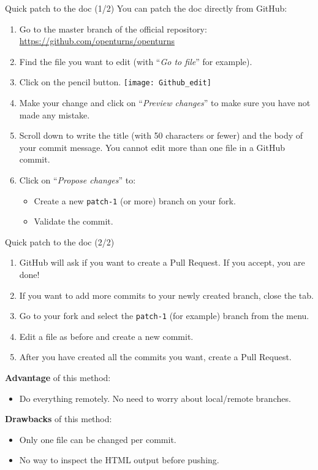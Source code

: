 \documentclass[8pt]{beamer}
\begin{document}
\begin{frame}{Quick patch to the doc (1/2)}
You can patch the doc directly from GitHub:

\begin{enumerate}
    \item Go to the \alert{master} branch of the official repository: \url{https://github.com/openturns/openturns}
    \item Find the file you want to edit (with ``\alert{\emph{Go to file}}'' for example).
    \item Click on the pencil button.
    \texttt{[image: Github\_edit]}
    \item Make your change and click on ``\alert{\emph{Preview changes}}'' to make sure you have not made any mistake.
    \item Scroll down to write the title (with \alert{50 characters or fewer}) and the body of your commit message. You \alert{cannot edit more than one file} in a GitHub commit.
    \item Click on ``\alert{\emph{Propose changes}}'' to:
    \begin{itemize}
        \item Create a new \texttt{patch-1} (or more) branch on your fork.
        \item Validate the commit.
    \end{itemize}
    \setcounter{enumindex}{\value{enumi}}
\end{enumerate}
\end{frame}


\begin{frame}{Quick patch to the doc (2/2)}
\begin{enumerate}
    \setcounter{enumi}{\value{enumindex}}
    \item GitHub will ask if you want to create a \alert{Pull Request}. If you accept, you are done!
    \item If you want to \alert{add more commits} to your newly created branch, close the tab.
    \item Go to \alert{your fork} and select the \alert{\texttt{patch-1}} (for example) branch from the menu.
    \item \alert{Edit} a file as before and create a \alert{new commit}.
    \item After you have created all the commits you want, create a \alert{Pull Request}.
\end{enumerate}

\textbf{Advantage} of this method:
\begin{itemize}
    \item Do everything \alert{remotely}. No need to worry about local/remote branches.
\end{itemize}

\textbf{Drawbacks} of this method:
\begin{itemize}
    \item Only \alert{one file} can be changed \alert{per commit}.
    \item \alert{No way to inspect} the HTML output before pushing.
\end{itemize}
\end{frame}
\end{document}
